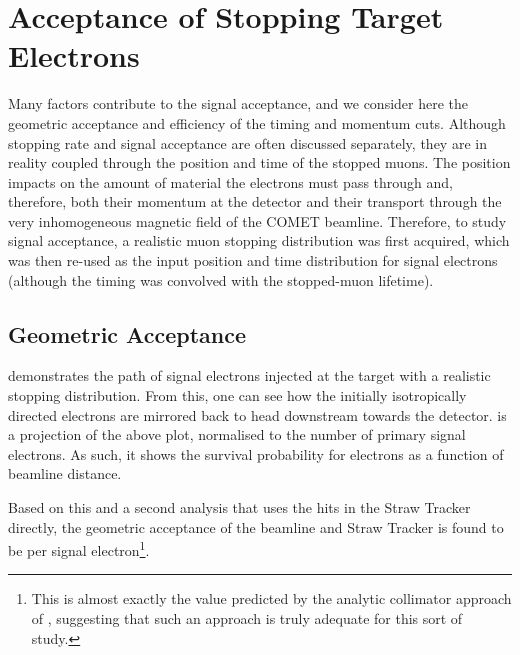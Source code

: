 \section{Acceptance of Stopping Target Electrons}
\FigSensGeomAccept
Many factors contribute to the signal acceptance, and we consider here the geometric acceptance and efficiency of the timing and momentum cuts.
Although stopping rate and signal acceptance are often discussed separately, they are in reality coupled through the position and time of the stopped muons.
The position impacts on the amount of material the electrons must pass through and, therefore, both their momentum at the detector and their transport through the very inhomogeneous magnetic field of the COMET beamline.
Therefore, to study signal acceptance, a realistic muon stopping distribution was first acquired, which was then re-used as the input position and time distribution for signal electrons (although the timing was convolved with the stopped-muon lifetime).

\subsection{Geometric Acceptance}
 demonstrates the path of signal electrons injected at the target with a realistic stopping distribution.
From this, one can see how the initially isotropically directed electrons are mirrored back to head downstream towards the detector.
 is a projection of the above plot, normalised to the number of primary signal electrons.
As such, it shows the survival probability for electrons as a function of beamline distance.

Based on this and a second analysis that uses the hits in the Straw Tracker directly, the geometric acceptance of the beamline and Straw Tracker is found to be \VarAcceptanceGeom per signal electron\footnote{
This is almost exactly the value predicted by the analytic collimator approach of , suggesting that such an approach is truly adequate for this sort of study.
}.

